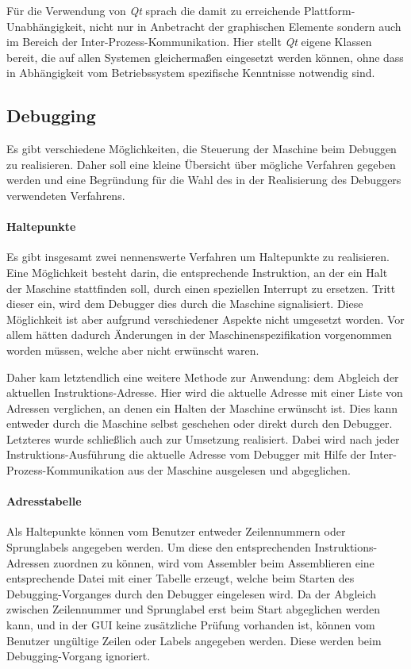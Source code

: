 Für die Verwendung von \emph{Qt} sprach die damit zu erreichende Plattform-Unabhängigkeit, nicht nur in Anbetracht der graphischen Elemente sondern auch im Bereich der Inter-Prozess-Kommunikation. Hier stellt \emph{Qt} eigene Klassen bereit, die auf allen Systemen gleichermaßen eingesetzt werden können, ohne dass in Abhängigkeit vom Betriebssystem spezifische Kenntnisse notwendig sind.

\subsection{Debugging}

Es gibt verschiedene Möglichkeiten, die Steuerung der Maschine beim Debuggen zu realisieren. Daher soll eine kleine Übersicht über mögliche Verfahren gegeben werden und eine Begründung für die Wahl des in der Realisierung des Debuggers verwendeten Verfahrens. 

\paragraph{Haltepunkte}
Es gibt insgesamt zwei nennenswerte Verfahren um Haltepunkte zu realisieren. Eine Möglichkeit besteht darin, die entsprechende Instruktion, an der ein Halt der Maschine stattfinden soll, durch einen speziellen Interrupt zu ersetzen. Tritt dieser ein, wird dem Debugger dies durch die Maschine signalisiert. Diese Möglichkeit ist aber aufgrund verschiedener Aspekte nicht umgesetzt worden. Vor allem hätten dadurch Änderungen in der Maschinenspezifikation vorgenommen worden müssen, welche aber nicht erwünscht waren.

Daher kam letztendlich eine weitere Methode zur Anwendung: dem Abgleich der aktuellen Instruktions-Adresse. Hier wird die aktuelle Adresse mit einer Liste von Adressen verglichen, an denen ein Halten der Maschine erwünscht ist. Dies kann entweder durch die Maschine selbst geschehen oder direkt durch den Debugger. Letzteres wurde schließlich auch zur Umsetzung realisiert. Dabei wird nach jeder Instruktions-Ausführung die aktuelle Adresse vom Debugger mit Hilfe der Inter-Prozess-Kommunikation aus der Maschine ausgelesen und abgeglichen.

\paragraph{Adresstabelle}
Als Haltepunkte können vom Benutzer entweder Zeilennummern oder Sprunglabels angegeben werden. Um diese den entsprechenden Instruktions-Adressen zuordnen zu können, wird vom Assembler beim Assemblieren eine entsprechende Datei mit einer Tabelle erzeugt, welche beim Starten des Debugging-Vorganges durch den Debugger eingelesen wird. Da der Abgleich zwischen Zeilennummer und Sprunglabel erst beim Start abgeglichen werden kann, und in der GUI keine zusätzliche Prüfung vorhanden ist, können vom Benutzer ungültige Zeilen oder Labels angegeben werden. Diese werden beim Debugging-Vorgang ignoriert.

